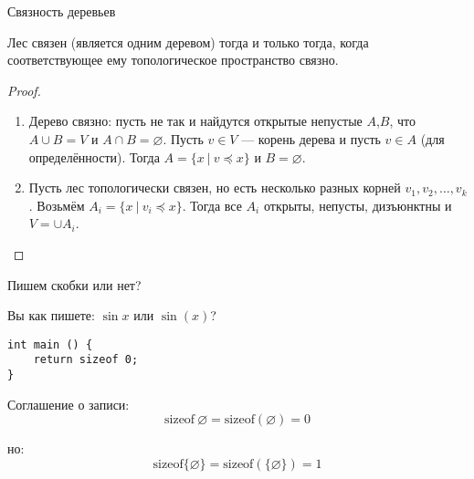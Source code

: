 \documentclass[aspectratio=169]{beamer}
\begin{document}
\begin{frame}{Связность деревьев}

\begin{lemmarus}Лес связен (является одним деревом) тогда и только тогда, когда соответствующее ему 
топологическое пространство связно.\end{lemmarus}

\begin{proof}\begin{enumerate}\item Дерево связно: пусть не так и найдутся открытые непустые $A$,$B$, что 
$A \cup B = V$ и $A \cap B = \varnothing$. Пусть $v \in V$ --- корень
дерева и пусть $v \in A$ (для определённости). Тогда $A = \{ x \ |\ v \preceq x \}$ и $B = \varnothing$.
\item Пусть лес топологически связен, но есть несколько разных корней $v_1, v_2, \dots, v_k$. 
Возьмём $A_i = \{ x\ |\ v_i \preceq x \}$. Тогда все $A_i$ открыты, непусты, дизъюнктны и $V = \cup A_i$.
\end{enumerate}
\end{proof}
\end{frame}

\begin{frame}[fragile]{Пишем скобки или нет?}

Вы как пишете: $\sin x$ или $\sin (x)$? \pause

\begin{verbatim}
int main () {
    return sizeof 0;
}
\end{verbatim}
\pause

Соглашение о записи:
$$\text{sizeof}\ \varnothing = \text{sizeof}(\varnothing) = 0$$

но:
   $$\text{sizeof}\{\varnothing\} = \text{sizeof}(\{\varnothing\}) = 1$$

\end{frame}
\end{document}
